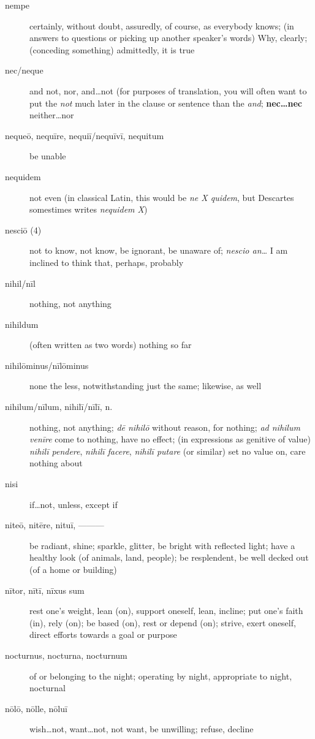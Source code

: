 \begin{description}
    \item[nempe] certainly, without doubt, assuredly, of course, as everybody knows; (in answers to questions or picking up another speaker's words) Why, clearly; (conceding something) admittedly, it is true
    \item[nec/neque] \marginnote{*}and not, nor, and\dots not (for purposes of translation, you will often want to put the \textit{not} much later in the clause or sentence than the \textit{and}; \textbf{nec\dots nec} neither\dots nor
    \item[nequeō, nequīre, nequiī/nequīvī, nequitum] be unable
    \item[nequidem] not even (in classical Latin, this would be \textit{ne X quidem}, but Descartes somestimes writes \textit{nequidem X})
    \item[nesciō (4)] \marginnote{*}not to know, not know, be ignorant, be unaware of; \textit{nescio an\dots} I am inclined to think that, perhaps, probably
    \item[nihil/nīl] \marginnote{*}nothing, not anything
    \item[nihildum] (often written as two words) nothing so far
    \item[nihilōminus/nīlōminus] none the less, notwithstanding just the same; likewise, as well
    \item[nihilum/nīlum, nihilī/nīlī, n.] nothing, not anything; \textit{dē nihilō} without reason, for nothing; \textit{ad nihilum venīre} come to nothing, have no effect; (in expressions as genitive of value) \textit{nihilī pendere}, \textit{nihilī facere}, \textit{nihilī putare} (or similar) set no value on, care nothing about
    \item[nisi] \marginnote{*}if\dots not, unless, except if
    \item[niteō, nitēre, nituī, ———] be radiant, shine; sparkle, glitter, be bright with reflected light; have a healthy look (of animals, land, people); be resplendent, be well decked out (of a home or building)
    \item[nītor, nītī, nīxus sum] \marginnote{*}rest one's weight, lean (on), support oneself, lean, incline; put one's faith (in), rely (on); be based (on), rest or depend (on); strive, exert oneself, direct efforts towards a goal or purpose
    \item[nocturnus, nocturna, nocturnum] of or belonging to the night; operating by night, appropriate to night, nocturnal
    \item[nōlō, nōlle, nōluī] \marginnote{*}wish\dots not, want\dots not, not want, be unwilling; refuse, decline

\end{description}

